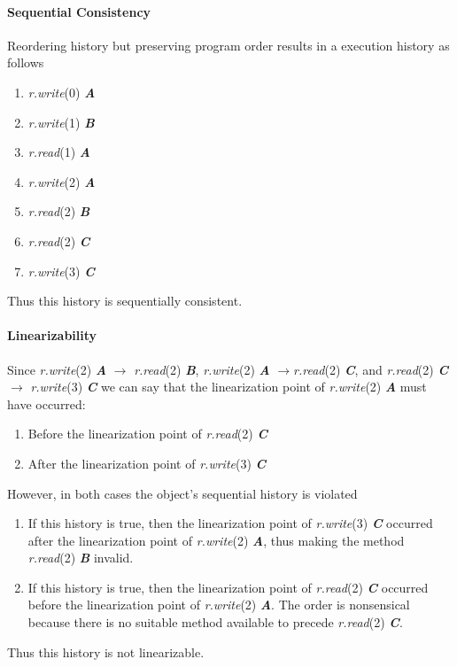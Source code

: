 \documentclass[12pt,letterpaper,titlepage]{article}
\newcommand{\methodcall}[4]{\textlangle{}\emph{#1.#2}(#3) \emph{\textbf{#4}}\textrangle{}}
\newcommand{\pre}{$\rightarrow$}
\begin{document}
    \paragraph{Sequential Consistency} Reordering history but preserving program order results in a execution history as follows
    \begin{enumerate}
        \itemsep 0em 
        \item \methodcall{r}{write}{0}{A}
        \item \methodcall{r}{write}{1}{B}
        \item \methodcall{r}{read}{1}{A}
        \item \methodcall{r}{write}{2}{A}
        \item \methodcall{r}{read}{2}{B}
        \item \methodcall{r}{read}{2}{C}
        \item \methodcall{r}{write}{3}{C}
    \end{enumerate}
    Thus this history is sequentially consistent.
    
    
    \paragraph{Linearizability} Since \methodcall{r}{write}{2}{A} $\rightarrow$ \methodcall{r}{read}{2}{B}, \methodcall{r}{write}{2}{A} \pre \methodcall{r}{read}{2}{C}, and \methodcall{r}{read}{2}{C} $\rightarrow$ \methodcall{r}{write}{3}{C} we can say that the linearization point of \methodcall{r}{write}{2}{A} must have occurred:
    \begin{enumerate}
        \item Before the linearization point of \methodcall{r}{read}{2}{C}
        \item After the linearization point of \methodcall{r}{write}{3}{C}
    \end{enumerate}
    However, in both cases the object's sequential history is violated
    \begin{enumerate}
        \item If this history is true, then the linearization point of \methodcall{r}{write}{3}{C} occurred after the linearization point of \methodcall{r}{write}{2}{A}, thus making the method \methodcall{r}{read}{2}{B} invalid.
        \item If this history is true, then the linearization point of \methodcall{r}{read}{2}{C} occurred before the linearization point of \methodcall{r}{write}{2}{A}. The order is nonsensical because there is no suitable method available to precede \methodcall{r}{read}{2}{C}.
    \end{enumerate}
    Thus this history is not linearizable.
    
\end{document}
